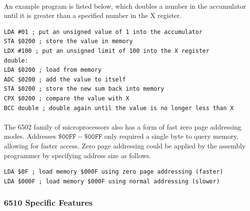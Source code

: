 \documentclass{article}
\begin{document}
\paragraph{}
An example program is listed below, which doubles a number in the accumulator until it is greater than a specified number in the X register.

\begin{lstlisting}
LDA #01 ; put an unsigned value of 1 into the accumulator
STA $0200 ; store the value in memory
LDX #100 ; put an unsigned limit of 100 into the X register
double: 
LDA $0200 ; load from memory
ADC $0200 ; add the value to itself
STA $0200 ; store the new sum back into memory
CPX $0200 ; compare the value with X
BCC double ; double again until the value is no longer less than X
\end{lstlisting}

\paragraph{}
The 6502 family of microprocessors also has a form of fast zero page addressing modes. Addresses $\mathtt{\$00FF - \$00FF}$ only required a single byte to query memory, allowing for faster access. Zero page addressing could be applied by the assembly programmer by specifying address size as follows.
\begin{lstlisting}
LDA $0F ; load memory $000F using zero page addressing (faster)
LDA $000F ; load memory $000F using normal addressing (slower)
\end{lstlisting}

\subsubsection{6510 Specific Features}
\end{document}
